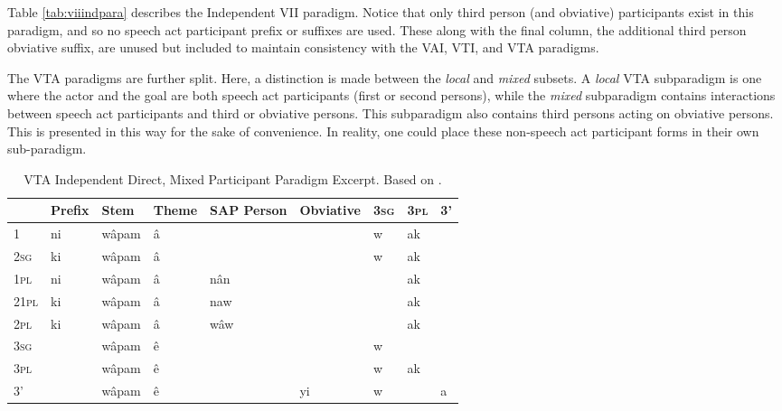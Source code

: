 Table \ref{tab:viiindpara} describes the Independent VII paradigm. Notice that only third person (and obviative) participants exist in this paradigm, and so no speech act participant prefix or suffixes are used. These along with the final column, the additional third person obviative suffix, are unused but included to maintain consistency with the VAI, VTI, and VTA paradigms. 


The VTA paradigms are further split. Here, a distinction is made between the \textit{local} and \textit{mixed} subsets. A \textit{local} VTA subparadigm is one where the actor and the goal are both speech act participants (first or second persons), while the \textit{mixed} subparadigm contains interactions between speech act participants and third or obviative persons. This subparadigm also contains third persons acting on obviative persons. This is presented in this way for the sake of convenience. In reality, one could place these non-speech act participant forms in their own sub-paradigm.

\begin{table}
    \begin{tabular}{lllllllll}
    \toprule
     & Prefix & Stem  & Theme & SAP Person & Obviative & 3\textsc{sg} & 3\textsc{pl} & 3' \\
    \midrule
    
    1    & ni     & wâpam & â     &            &           & w          & ak         &    \\
2\textsc{sg}    & ki     & wâpam & â     &            &           & w          & ak         &    \\
1\textsc{pl}  & ni     & wâpam & â     & nân        &           &            & ak         &    \\
21\textsc{pl} & ki     & wâpam & â     & naw        &           &            & ak         &    \\
2\textsc{pl}  & ki     & wâpam & â     & wâw        &           &            & ak         &    \\
3\textsc{sg}    &        & wâpam & ê     &            &           & w          &            &    \\
3\textsc{pl}  &        & wâpam & ê     &            &           & w          & ak         &    \\
3'   &        & wâpam & ê     &            & yi        & w          &            & a \\
    \bottomrule
  \end{tabular}
  \caption{
    VTA Independent Direct, Mixed Participant Paradigm Excerpt. Based on \citet[418]{Wolvengrey2011}.\label{tab:vtadir}
  }
\end{table}

